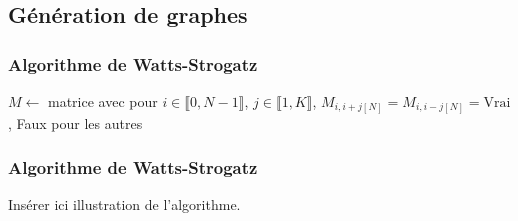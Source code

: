 \documentclass[draft]{beamer}
\begin{document}
\subsection{Génération de graphes}
\begin{frame}
  \frametitle{Algorithme de Watts-Strogatz}
  \fontsize{10}{11}\selectfont
  \begin{algorithm}[H]
  $M \leftarrow $ matrice avec pour $i\in \llbracket0,N-1\rrbracket$, $j\in \llbracket1,K\rrbracket$, $M_{i,i+j[N]} = M_{i,i-j[N]} = \text{Vrai}$, Faux pour les autres \;
  \end{algorithm}
\end{frame} 
\begin{frame}
  \frametitle{Algorithme de Watts-Strogatz}
  Insérer ici illustration de l'algorithme.
\end{frame}
\end{document}
